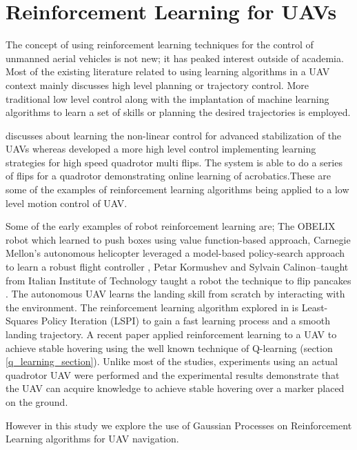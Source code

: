 \documentclass[12pt]{report}
\begin{document}
\section{Reinforcement Learning for UAVs}
The concept of using reinforcement learning techniques for the control of unmanned aerial
vehicles is not new; it has peaked interest outside of academia. Most of the existing literature related to using learning algorithms in a UAV context mainly discusses high level planning or trajectory control. More traditional low level control along with the implantation of machine learning algorithms to learn a set of skills or planning the  desired trajectories is employed.\par 
\cite{bou2010controller} discusses about learning the non-linear control for advanced stabilization of the UAVs whereas \cite{lupashin2010simple} developed a more high level control implementing learning strategies for high speed quadrotor multi flips. The system is able to do a series of flips for a quadrotor demonstrating online learning of acrobatics.These are some of the examples of reinforcement learning algorithms being applied to a low level motion control of UAV.\par 
Some of the early examples of robot reinforcement learning are; The OBELIX robot which learned to push boxes \cite{mahadevan1992automatic} using value function-based approach, Carnegie Mellon’s autonomous helicopter leveraged a
model-based policy-search approach to learn a robust flight controller \cite{bagnell2001autonomous}, Petar Kormushev and Sylvain Calinon–taught from Italian Institute of Technology taught a robot the technique to flip pancakes \cite{kormushev2010robot}. The autonomous UAV learns the landing skill from scratch by interacting with the environment. The reinforcement learning algorithm explored in \cite{Shaker:2010:VLS:1901614.1902128}  is Least-Squares Policy Iteration (LSPI) to gain a fast learning process and a smooth landing trajectory. A recent paper \cite{sugimoto2016acquisition} applied reinforcement learning to a UAV to achieve stable hovering using the well known technique of Q-learning (section \ref{q_learning_section}). Unlike most of the studies, experiments using an actual quadrotor UAV were performed and the experimental results demonstrate that the UAV can acquire knowledge to achieve stable hovering over a marker placed on the ground.\par 
However in this study we explore the use of Gaussian Processes on Reinforcement Learning algorithms for UAV navigation.
\end{document}
